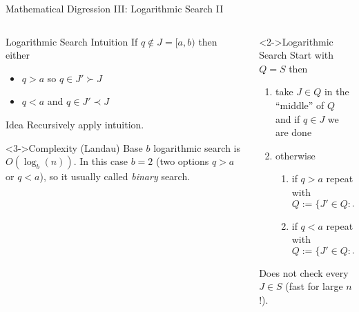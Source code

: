 \documentclass[xetex]{beamer}
\begin{document}
\begin{frame}{Mathematical Digression III: Logarithmic Search II}
  \begin{columns}
    \begin{column}{.5\linewidth}
      \begin{block}{Logarithmic Search Intuition}
        If $q \notin J = [a,b)$ then either
        \begin{itemize}
          \item $q > a$ so $q \in J' \succ J$
          \item $q < a$ and $q \in J' \prec J$
        \end{itemize}
      \end{block}
      \begin{alertblock}{Idea}
        Recursively apply intuition.
      \end{alertblock}
      \begin{block}<3->{Complexity (Landau)}
        Base $b$ logarithmic search is $O(\log_b(n))$. In this case
        $b = 2$ (two options $q > a$ or $q < a$), so it usually called
        \emph{binary} search.
      \end{block}
    \end{column}
    \begin{column}{.5\linewidth}
      \begin{alertblock}<2->{Logarithmic Search}
        Start with $Q = S$ then
        \begin{enumerate}
          \item take $J \in Q$ in the ``middle'' of $Q$ and if $q \in J$ we are done
          \item otherwise
            \begin{enumerate}
              \item if $q > a$ repeat with $Q := \{J' \in Q : J' \succ J\}$
              \item if $q < a$ repeat with $Q := \{J' \in Q : J' \prec J\}$
            \end{enumerate}
        \end{enumerate}
        Does not check every $J \in S$ (fast for large $n$!).
      \end{alertblock}
    \end{column}
  \end{columns}
\end{frame}
\end{document}
